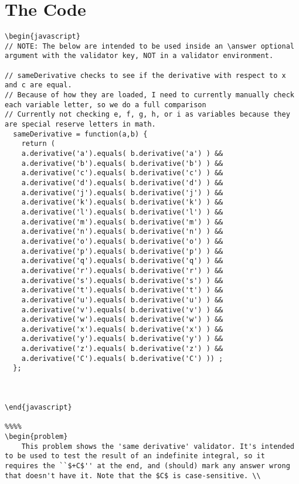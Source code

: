 \documentclass{ximera}
\begin{document}
\section{The Code}

\begin{verbatim}
\begin{javascript}
// NOTE: The below are intended to be used inside an \answer optional argument with the validator key, NOT in a validator environment.

// sameDerivative checks to see if the derivative with respect to x and c are equal.
// Because of how they are loaded, I need to currently manually check each variable letter, so we do a full comparison
// Currently not checking e, f, g, h, or i as variables because they are special reserve letters in math.
  sameDerivative = function(a,b) {
    return (
    a.derivative('a').equals( b.derivative('a') ) &&
    a.derivative('b').equals( b.derivative('b') ) &&
    a.derivative('c').equals( b.derivative('c') ) &&
    a.derivative('d').equals( b.derivative('d') ) &&
    a.derivative('j').equals( b.derivative('j') ) &&
    a.derivative('k').equals( b.derivative('k') ) &&
    a.derivative('l').equals( b.derivative('l') ) &&
    a.derivative('m').equals( b.derivative('m') ) &&
    a.derivative('n').equals( b.derivative('n') ) &&
    a.derivative('o').equals( b.derivative('o') ) &&
    a.derivative('p').equals( b.derivative('p') ) &&
    a.derivative('q').equals( b.derivative('q') ) &&
    a.derivative('r').equals( b.derivative('r') ) &&
    a.derivative('s').equals( b.derivative('s') ) &&
    a.derivative('t').equals( b.derivative('t') ) &&
    a.derivative('u').equals( b.derivative('u') ) &&
    a.derivative('v').equals( b.derivative('v') ) &&
    a.derivative('w').equals( b.derivative('w') ) &&
    a.derivative('x').equals( b.derivative('x') ) && 
    a.derivative('y').equals( b.derivative('y') ) &&
    a.derivative('z').equals( b.derivative('z') ) &&
    a.derivative('C').equals( b.derivative('C') )) ;
  };



\end{javascript}

%%%%
\begin{problem}
    This problem shows the 'same derivative' validator. It's intended to be used to test the result of an indefinite integral, so it requires the ``$+C$'' at the end, and (should) mark any answer wrong that doesn't have it. Note that the $C$ is case-sensitive. \\
    

\end{verbatim}
\end{document}
